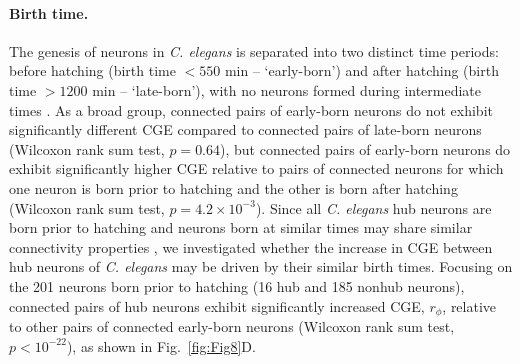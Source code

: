 \documentclass[10pt,letterpaper]{article}
\begin{document}
{\paragraph{Birth time.}
The genesis of neurons in \emph{C. elegans} is separated into two distinct time periods: before hatching (birth time $<550$ min -- `early-born') and after hatching (birth time $>1200$ min -- `late-born'), with no neurons formed during intermediate times \cite{Varier2011}.
As a broad group, connected pairs of early-born neurons do not exhibit significantly different CGE compared to connected pairs of late-born neurons (Wilcoxon rank sum test, $p = 0.64$), but connected pairs of early-born neurons do exhibit significantly higher CGE relative to pairs of connected neurons for which one neuron is born prior to hatching and the other is born after hatching (Wilcoxon rank sum test, $p = 4.2 \times 10^{-3}$).
Since all \emph{C. elegans} hub neurons are born prior to hatching \cite{Towlson2013} and neurons born at similar times may share similar connectivity properties \cite{Varier2011, Towlson2013}, we investigated whether the increase in CGE between hub neurons of \emph{C. elegans} may be driven by their similar birth times.
Focusing on the 201 neurons born prior to hatching (16 hub and 185 nonhub neurons), connected pairs of hub neurons exhibit significantly increased CGE, $r_\phi$, relative to other pairs of connected early-born neurons (Wilcoxon rank sum test, $p < 10^{-22}$), as shown in Fig.~\ref{fig:Fig8}D.


}
\end{document}
